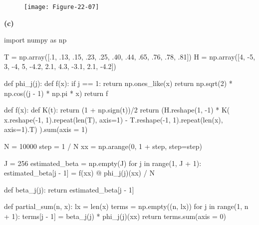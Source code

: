\begin{figure}[H]
\texttt{[image: Figure-22-07]}
\end{figure}

\textbf{(c)}

\begin{python}
import numpy as np

T = np.array([.1, .13, .15, .23, .25, .40, .44, .65, .76, .78, .81])
H = np.array([4, -5, 3, -4, 5, -4.2, 2.1, 4.3, -3.1, 2.1, -4.2])

def phi_j(j):
    def f(x):
        if j == 1:
            return np.ones_like(x)
        return np.sqrt(2) * np.cos((j - 1) * np.pi * x)
    return f

def f(x):
    def K(t):
        return (1 + np.sign(t))/2
    return (H.reshape(1, -1) * K(
        x.reshape(-1, 1).repeat(len(T), axis=1) - T.reshape(-1, 1).repeat(len(x), axis=1).T)
    ).sum(axis = 1)
\end{python}

\begin{python}
N = 10000
step = 1 / N
xx = np.arange(0, 1 + step, step=step)

J = 256
estimated_beta = np.empty(J)
for j in range(1, J + 1):
    estimated_beta[j - 1] = f(xx) @ phi_j(j)(xx) / N
    
def beta_j(j):
    return estimated_beta[j - 1]

def partial_sum(n, x):
    lx = len(x)
    terms = np.empty((n, lx))
    for j in range(1, n + 1):
        terms[j - 1] = beta_j(j) * phi_j(j)(xx)
    return terms.sum(axis = 0)
\end{python}


